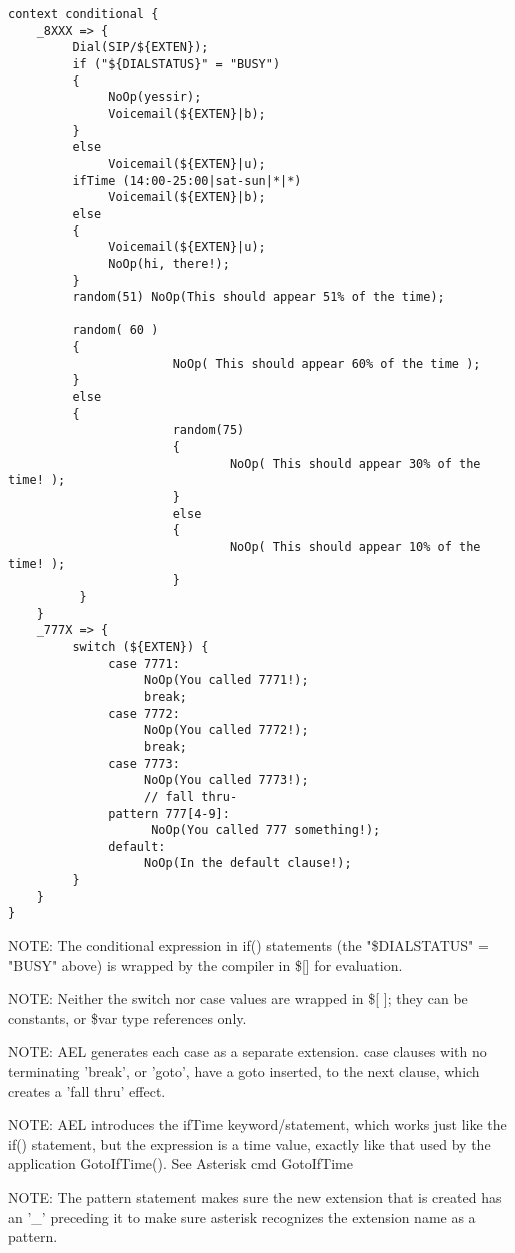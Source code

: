 {\begin{verbatim}
context conditional {
    _8XXX => {
         Dial(SIP/${EXTEN});
         if ("${DIALSTATUS}" = "BUSY")
         {
              NoOp(yessir);
              Voicemail(${EXTEN}|b);
         }
         else
              Voicemail(${EXTEN}|u);
         ifTime (14:00-25:00|sat-sun|*|*) 
              Voicemail(${EXTEN}|b);
         else
         {
              Voicemail(${EXTEN}|u);
              NoOp(hi, there!);
         }
         random(51) NoOp(This should appear 51% of the time);

         random( 60 )
         {
                       NoOp( This should appear 60% of the time );
         }
         else
         {
                       random(75)
                       {
                               NoOp( This should appear 30% of the time! );
                       }
                       else
                       {
                               NoOp( This should appear 10% of the time! );
                       }
          }
    }
    _777X => {
         switch (${EXTEN}) {
              case 7771:
                   NoOp(You called 7771!);
                   break;
              case 7772:
                   NoOp(You called 7772!);
                   break;
              case 7773:
                   NoOp(You called 7773!);
                   // fall thru-
              pattern 777[4-9]:
                    NoOp(You called 777 something!);
              default:
                   NoOp(In the default clause!);
         }
    }
}
\end{verbatim}

NOTE: The conditional expression in if() statements (the
      "\${DIALSTATUS}" = "BUSY" above) is wrapped by the compiler in 
      \$[] for evaluation.

NOTE: Neither the switch nor case values are wrapped in \$[ ]; they can
      be constants, or \${var} type references only.

NOTE: AEL generates each case as a separate extension. case clauses
      with no terminating 'break', or 'goto', have a goto inserted, to
      the next clause, which creates a 'fall thru' effect.

NOTE: AEL introduces the ifTime keyword/statement, which works just
      like the if() statement, but the expression is a time value,
      exactly like that used by the application GotoIfTime(). See
      Asterisk cmd GotoIfTime

NOTE: The pattern statement makes sure the new extension that is
      created has an '\_' preceding it to make sure asterisk recognizes
      the extension name as a pattern.

}
